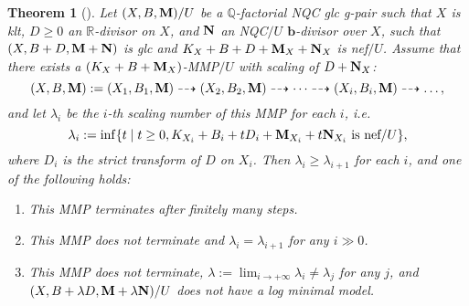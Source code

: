 \documentclass[11pt]{amsart}
\numberwithin{equation}{section}
\newcommand{\bb}{\bm{b}}
\newcommand{\Mm}{{\bf{M}}}
\newcommand{\NN}{{\bf{N}}}
\newcommand{\Qq}{\mathbb{Q}}
\newcommand{\Rr}{\mathbb{R}}
\newtheorem{thm}{Theorem}[section]
\theoremstyle{definition}
\theoremstyle{definition}
\theoremstyle{definition}
\begin{document}
\begin{thm}[{\cite[Remark 3.21, Theorem 4.1]{HL18}}]\label{thm: hl18 4.1}
Let $(X,B,\Mm)/U$ be a $\Qq$-factorial NQC glc g-pair such that $X$ is klt, $D\geq 0$ an $\Rr$-divisor on $X$, and $\NN$ an NQC$/U$ $\bb$-divisor over $X$, such that $(X,B+D,\Mm+\NN)$ is glc and $K_X+B+D+\Mm_X+\NN_X$ is nef$/U$. Assume that there exists a $(K_X+B+\Mm_X)$-MMP$/U$ with scaling of $D+\NN_X$:
$$(X,B,\Mm):=(X_1,B_1,\Mm)\dashrightarrow (X_2,B_2,\Mm)\dashrightarrow\dots\dashrightarrow (X_i,B_i,\Mm)\dashrightarrow\dots,$$
and let $\lambda_i$ be the $i$-th scaling number of this MMP for each $i$, i.e.
$$\lambda_i:=\inf\{t\mid t\geq 0, K_{X_i}+B_i+tD_i+\Mm_{X_i}+t\NN_{X_i}\text{ is nef/}U\},$$
where $D_i$ is the strict transform of $D$ on $X_i$. Then $\lambda_i\geq\lambda_{i+1}$ for each $i$, and one of the following holds:
\begin{enumerate}
    \item This MMP terminates after finitely many steps.
    \item This MMP does not terminate and $\lambda_i=\lambda_{i+1}$ for any $i\gg 0$.
    \item This MMP does not terminate,  $\lambda:=\lim_{i\rightarrow+\infty}\lambda_i\not=\lambda_j$ for any $j$, and $(X,B+\lambda D,\Mm+\lambda\NN)/U$ does not have a log minimal model.
\end{enumerate}
\end{thm}
\end{document}
